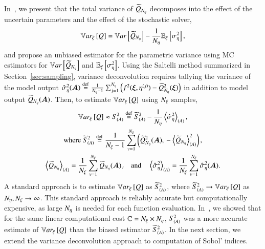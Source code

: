 In~\cite{clements-etal-2024}, we present that the total variance of $\widetilde{Q}_{{N_\eta}}$ decomposes into the effect of the uncertain parameters and the effect of the stochastic solver, 
\begin{equation} \label{m2eq:deconv}
    \mathbb{V}ar_{\xi}\left[Q\right] = \mathbb{V}ar\left[\widetilde{Q}_{{N_\eta}}\right] - \frac{1}{{N_\eta}}\mathbb{E}_\xi\left[\sigma^2_\eta\right],
\end{equation}
and propose an unbiased estimator for the parametric variance using MC estimators for $\mathbb{V}ar\left[\widetilde{Q}_{{N_\eta}}\right]$ and $\mathbb{E}_\xi\left[\sigma^2_\eta\right]$.
Using the Saltelli method summarized in Section~\ref{sec:sampling}, variance deconvolution requires tallying the variance of the model output $\hat{\sigma}^2_\eta(\bm{A}) \overset{\operatorname{def}}{=} \frac{1}{{N_\eta}-1} \sum_{j=1}^{{N_\eta}} \left( f^2(\bm{\xi}, \eta^{(j)} ) - \widetilde{Q}_{{N_\eta}}^2(\bm{\xi}) \right)$ in addition to model output $\widetilde{Q}_{{N_\eta}}(\bm{A})$.
Then, to estimate $\mathbb{V}ar_{\xi}\left[Q\right]$ using ${N_\xi}$ samples,
\begin{gather} \label{m2eq:var-deconv}
    \mathbb{V}ar_{\xi}\left[Q\right] \approx S^2_{\left( A \right)} \overset{\operatorname{def}}{=} \widetilde{S}^2_{\left( A \right)} - \frac{1}{{N_\eta}}\left< \hat{\sigma}^2_\eta \right>_{\left(A \right)} ,\\ \label{m2eq:samp-var}
    \text{where } \widetilde{S}^2_{\left( A \right)} \overset{\operatorname{def}}{=} \frac{1}{{N_\xi} - 1} \sum_{v=1}^{{N_\xi}} \left( \widetilde{Q}_{{N_\eta}}^2 (\bm{A})_v - \left< \widetilde{Q}_{{N_\eta}} \right>_{\left(A \right)}^2 \right) , \\ \nonumber 
    \left< \widetilde{Q}_{{N_\eta}} \right>_{\left(A \right)} = \frac{1}{{N_\xi}} \sum_{v=1}^{{N_\xi}} \widetilde{Q}_{{N_\eta}}(\bm{A})_v \quad \text{and} \quad \left< \hat{\sigma}^2_\eta \right>_{\left(A \right)} = \frac{1}{{N_\xi}} \sum_{v=1}^{{N_\xi}} \hat{\sigma}^2_\eta(\bm{A}) .
\end{gather}
A standard approach is to estimate $\mathbb{V}ar_{\xi}\left[Q\right]$ as $\widetilde{S}^2_{\left( A \right)}$, where $\widetilde{S}^2_{\left( A \right)} \rightarrow \mathbb{V}ar_{\xi}\left[Q\right]$ as ${N_\eta},{N_\xi} \rightarrow \infty$. 
This standard approach is reliably accurate but computationally expensive, as large ${N_\eta}$ is needed for each function evaluation.
In~\cite{clements-etal-2024}, we showed that for the same linear computational cost $\mathbb{C} = {N_\xi} \times {N_\eta}$, $S^2_{\left( A \right)}$ was a more accurate estimate of $\mathbb{V}ar_{\xi}\left[Q\right]$ than the biased estimator $\widetilde{S}^2_{\left( A \right)}$. 
In the next section, we extend the variance deconvolution approach to computation of Sobol' indices. 